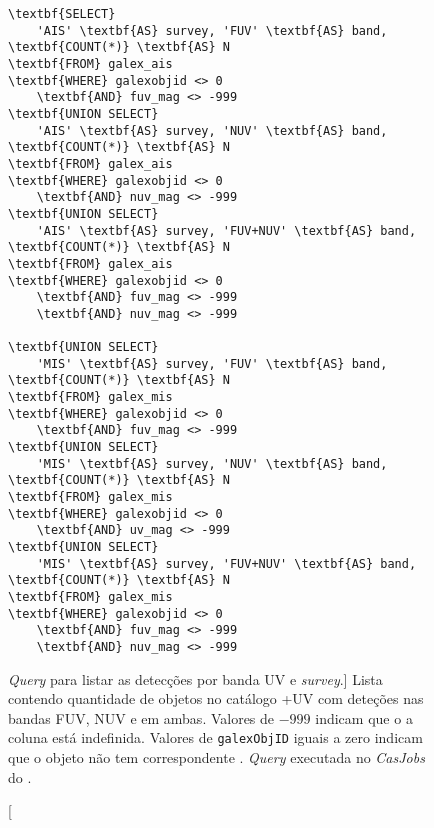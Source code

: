 \begin{figure}
\begin{Verbatim}[frame=single,commandchars=\\\{\}]
\textbf{SELECT}
	'AIS' \textbf{AS} survey, 'FUV' \textbf{AS} band, \textbf{COUNT(*)} \textbf{AS} N
\textbf{FROM} galex_ais
\textbf{WHERE} galexobjid <> 0
	\textbf{AND} fuv_mag <> -999
\textbf{UNION SELECT}
	'AIS' \textbf{AS} survey, 'NUV' \textbf{AS} band, \textbf{COUNT(*)} \textbf{AS} N
\textbf{FROM} galex_ais
\textbf{WHERE} galexobjid <> 0
	\textbf{AND} nuv_mag <> -999
\textbf{UNION SELECT}
	'AIS' \textbf{AS} survey, 'FUV+NUV' \textbf{AS} band, \textbf{COUNT(*)} \textbf{AS} N
\textbf{FROM} galex_ais
\textbf{WHERE} galexobjid <> 0
	\textbf{AND} fuv_mag <> -999
	\textbf{AND} nuv_mag <> -999
	
\textbf{UNION SELECT}
	'MIS' \textbf{AS} survey, 'FUV' \textbf{AS} band, \textbf{COUNT(*)} \textbf{AS} N
\textbf{FROM} galex_mis
\textbf{WHERE} galexobjid <> 0
	\textbf{AND} fuv_mag <> -999
\textbf{UNION SELECT}
	'MIS' \textbf{AS} survey, 'NUV' \textbf{AS} band, \textbf{COUNT(*)} \textbf{AS} N
\textbf{FROM} galex_mis
\textbf{WHERE} galexobjid <> 0
	\textbf{AND} uv_mag <> -999
\textbf{UNION SELECT}
	'MIS' \textbf{AS} survey, 'FUV+NUV' \textbf{AS} band, \textbf{COUNT(*)} \textbf{AS} N
\textbf{FROM} galex_mis
\textbf{WHERE} galexobjid <> 0
	\textbf{AND} fuv_mag <> -999
	\textbf{AND} nuv_mag <> -999
\end{Verbatim}
	\caption
	[{\em Query} para listar as detecções por banda UV e {\em survey}.]
	{Lista contendo quantidade de objetos no catálogo \starlight+UV com deteções
	\galex nas bandas FUV, NUV e em ambas. Valores de $-999$ indicam que o a
	coluna está indefinida. Valores de \texttt{galexObjID} iguais a zero
	indicam que o objeto \starlight não tem correspondente {\galex}. {\em Query}
	executada no {\em CasJobs} do \starlight.}
	\label{fig:QueryListaPorBandaSurvey}
\end{figure}


